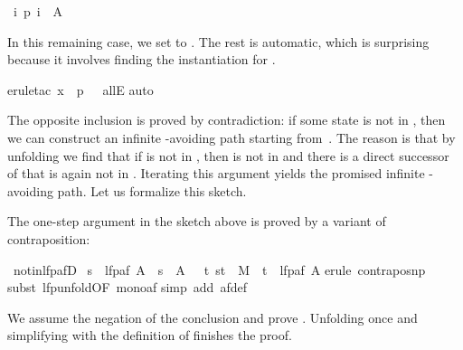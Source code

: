 \begin{isabellebody}
\begin{isamarkuptxt}
\begin{isabelle}
\ {\isasymexists}i{\isachardot}\ p\ i\ {\isasymin}\ A%
\end{isabelle}
In this remaining case, we set  to .
The rest is automatic, which is surprising because it involves
finding the instantiation 
for .%
\end{isamarkuptxt}%
\isamarkuptrue%
erule{\isacharunderscore}tac\ x\ {\isacharequal}\ {\isachardoublequote}p\ {}{\isachardoublequote}\ \ allE{\isacharparenright}\isanewline
\isamarkupfalse%
auto{\isacharparenright}\isanewline
\isamarkupfalse%
\isamarkupfalse%
%
\begin{isamarkuptext}%
The opposite inclusion is proved by contradiction: if some state
 is not in , then we can construct an
infinite -avoiding path starting from~. The reason is
that by unfolding  we find that if  is not in
, then  is not in  and there is a
direct successor of  that is again not in \mbox{}. Iterating this argument yields the promised infinite
-avoiding path. Let us formalize this sketch.

The one-step argument in the sketch above
is proved by a variant of contraposition:%
\end{isamarkuptext}%
\isamarkuptrue%
\ not{\isacharunderscore}in{\isacharunderscore}lfp{\isacharunderscore}afD{\isacharcolon}\isanewline
\ {\isachardoublequote}s\ {\isasymnotin}\ lfp{\isacharparenleft}af\ A{\isacharparenright}\ {\isasymLongrightarrow}\ s\ {\isasymnotin}\ A\ {\isasymand}\ {\isacharparenleft}{\isasymexists}\ t{\isachardot}\ {\isacharparenleft}s{\isacharcomma}t{\isacharparenright}\ {\isasymin}\ M\ {\isasymand}\ t\ {\isasymnotin}\ lfp{\isacharparenleft}af\ A{\isacharparenright}{\isacharparenright}{\isachardoublequote}\isanewline
\isamarkupfalse%
erule\ contrapos{\isacharunderscore}np{\isacharparenright}\isanewline
\isamarkupfalse%
subst\ lfp{\isacharunderscore}unfold{\isacharbrackleft}OF\ mono{\isacharunderscore}af{\isacharbrackright}{\isacharparenright}\isanewline
\isamarkupfalse%
simp\ add{\isacharcolon}\ af{\isacharunderscore}def{\isacharparenright}\isanewline
\isamarkupfalse%
\isamarkupfalse%
%
\begin{isamarkuptext}%
\noindent
We assume the negation of the conclusion and prove .
Unfolding  once and
simplifying with the definition of  finishes the proof.


\end{isamarkuptext}
\end{isabellebody}
